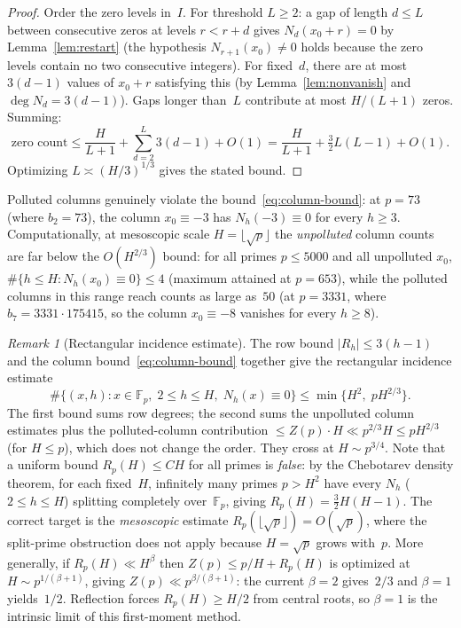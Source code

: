 \documentclass[11pt]{article}
\theoremstyle{definition}
\theoremstyle{remark}
\newtheorem{remark}[theorem]{Remark}
\begin{document}
\begin{proof}
Order the zero levels in~$I$.
For threshold $L \ge 2$: a gap of length $d \le L$
between consecutive zeros at levels $r < r + d$ gives
$N_d(x_0 + r) = 0$ by Lemma~\ref{lem:restart}
(the hypothesis $N_{r+1}(x_0) \ne 0$ holds because
the zero levels contain no two consecutive integers).
For fixed~$d$, there are at most $3(d{-}1)$ values of
$x_0 + r$ satisfying this (by Lemma~\ref{lem:nonvanish}
and $\deg N_d = 3(d{-}1)$).
Gaps longer than~$L$ contribute at most $H/(L{+}1)$ zeros.
Summing:
\[
\text{zero count} \le \frac{H}{L+1}
+ \sum_{d=2}^{L} 3(d{-}1) + O(1)
= \frac{H}{L+1} + \tfrac{3}{2}L(L{-}1) + O(1).
\]
Optimizing $L \asymp (H/3)^{1/3}$ gives the stated bound.
\end{proof}

Polluted columns genuinely violate the
bound~\eqref{eq:column-bound}: at $p = 73$ (where
$b_2 = 73$), the column $x_0 \equiv -3$ has
$N_h(-3) \equiv 0$ for every $h \ge 3$.
Computationally, at mesoscopic scale
$H = \lfloor\sqrt{p}\rfloor$ the \emph{unpolluted}
column counts are far below the $O(H^{2/3})$
bound: for all primes $p \le 5000$ and all unpolluted
$x_0$, $\#\{h \le H : N_h(x_0) \equiv 0\} \le 4$
(maximum attained at $p = 653$), while the polluted columns in this range reach counts
as large as~$50$ (at $p = 3331$, where
$b_7 = 3331 \cdot 175415$, so the column
$x_0 \equiv -8$ vanishes for every $h \ge 8$).

\begin{remark}[Rectangular incidence estimate]\label{rem:incidence}
The row bound $|R_h| \le 3(h{-}1)$ and the
column bound~\eqref{eq:column-bound} together give the
rectangular incidence estimate
\[
\#\{(x,h) : x \in \mathbb{F}_p,\; 2 \le h \le H,\;
N_h(x) \equiv 0\} \le \min\{H^2,\; p H^{2/3}\}.
\]
The first bound sums row degrees; the second sums the
unpolluted column estimates plus the polluted-column
contribution $\le Z(p) \cdot H \ll p^{2/3} H
\le p H^{2/3}$ (for $H \le p$), which does not change
the order.
They cross at $H \sim p^{3/4}$.
Note that a uniform bound $R_p(H) \le CH$ for all primes
is \emph{false}: by the Chebotarev density theorem, for
each fixed~$H$, infinitely many primes $p > H^2$ have
every $N_h$ ($2 \le h \le H$) splitting completely
over~$\mathbb{F}_p$, giving $R_p(H) = \frac{3}{2}H(H-1)$.
The correct target is the \emph{mesoscopic} estimate
$R_p(\lfloor\sqrt{p}\rfloor) = O(\sqrt{p})$,
where the split-prime obstruction does not apply because
$H = \sqrt{p}$ grows with~$p$.
More generally, if $R_p(H) \ll H^\beta$
then $Z(p) \le p/H + R_p(H)$ is optimized
at $H \sim p^{1/(\beta+1)}$, giving
$Z(p) \ll p^{\beta/(\beta+1)}$:
the current $\beta = 2$ gives~$2/3$
and $\beta = 1$ yields~$1/2$.
Reflection forces $R_p(H) \ge H/2$ from
central roots, so $\beta = 1$ is
the intrinsic limit of this first-moment method.
\end{remark}
\end{document}
